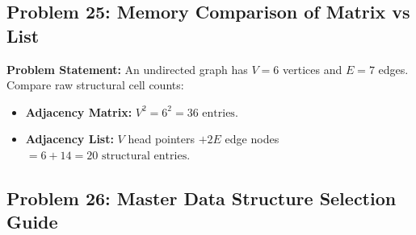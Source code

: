 \subsection{Problem 25: Memory Comparison of Matrix vs List}

\textbf{Problem Statement:} An undirected graph has $V = 6$ vertices and $E = 7$ edges. Compare raw structural cell counts:
\begin{itemize}
    \item \textbf{Adjacency Matrix:} $V^2 = 6^2 = \boxed{36 \text{ entries}}$.
    \item \textbf{Adjacency List:} $V$ head pointers $+ 2E$ edge nodes $= 6 + 14 = \boxed{20 \text{ structural entries}}$.
\end{itemize}

\subsection{Problem 26: Master Data Structure Selection Guide}

